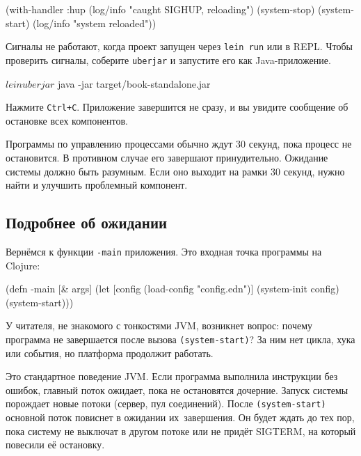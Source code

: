 
\begin{english}
  \begin{clojure}
(with-handler :hup
  (log/info "caught SIGHUP, reloading")
  (system-stop)
  (system-start)
  (log/info "system reloaded"))
  \end{clojure}
\end{english}

Сигналы не работают, когда проект запущен через \verb|lein run| или в
REPL. Чтобы проверить сигналы, соберите \verb|uberjar| и запустите его как
Java-приложение.

\begin{english}
  \begin{bash}
$ lein uberjar
$ java -jar target/book-standalone.jar
  \end{bash}
\end{english}

Нажмите \verb|Ctrl+C|. Приложение завершится не сразу, и вы увидите сообщение
об остановке всех компонентов.

Программы по управлению процессами обычно ждут 30 секунд, пока процесс не
остановится. В противном случае его завершают принудительно. Ожидание системы
должно быть разумным. Если оно выходит на рамки 30 секунд, нужно найти и
улучшить проблемный компонент.

\subsection{Подробнее об ожидании}


Вернёмся к функции \verb|-main| приложения. Это входная точка программы на
Clojure:

\begin{english}
  \begin{clojure}
(defn -main [& args]
  (let [config (load-config "config.edn")]
    (system-init config)
    (system-start)))
  \end{clojure}
\end{english}

У читателя, не знакомого с тонкостями JVM, возникнет вопрос: почему программа не
завершается после вызова \verb|(system-start)|? За ним нет цикла, хука или
события, но платформа продолжит работать.


Это стандартное поведение JVM. Если программа выполнила инструкции без ошибок,
главный поток ожидает, пока не остановятся дочерние. Запуск системы порождает
новые потоки (сервер, пул соединений). После \verb|(system-start)| основной
поток повиснет в ожидании их~завершения. Он будет ждать до тех пор, пока систему
не выключат в другом потоке или не придёт SIGTERM, на который повесили её
остановку.

